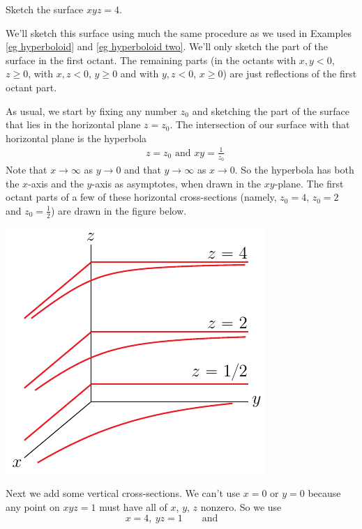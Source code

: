 \bigskip
\begin{eg}[$xyz=4$]\label{eg xyz}
\medskip
Sketch the surface $xyz=4$. 

\soln
We'll sketch this surface using much the same procedure as we used
in Examples \ref{eg hyperboloid} and \ref{eg hyperboloid two}.
We'll only sketch the part of the surface in the first octant. The
remaining parts (in the octants with $x,y<0$, $z\ge 0$, with
$x,z<0$, $y\ge 0$ and with $y,z<0$, $x\ge0$) are just reflections of
the first octant part.

As usual, we start by fixing any number $z_0$ 
and sketching the part of the surface that lies in the horizontal 
plane $z=z_0$. The intersection of our surface with that horizontal plane is 
the hyperbola
\begin{align*}
&z=z_0\text{\  \ and\ \ }xy=\frac{1}{z_0}
\end{align*}
Note that $x\rightarrow\infty$ as $y\rightarrow 0$ and that 
$y\rightarrow\infty$ as $x\rightarrow 0$. So the hyperbola 
has both the $x$-axis and the $y$-axis as asymptotes, when drawn in the $xy$-plane. 
The first octant parts of a few of these horizontal cross-sections 
(namely, $z_0=4$, $z_0=2$ and $z_0=\frac{1}{2}$)
are drawn in the figure below.
\begin{efig}
\begin{center}
   \includegraphics{seatB.pdf}
\end{center}
\end{efig}
Next we add some vertical cross-sections.
We can't use $x=0$ or $y=0$ because any point on $xyz=1$ 
must have all of $x$, $y$, $z$ nonzero. So we use
\begin{equation*}
x=4,\ yz=1\qquad\text{and}\qquad

\end{equation*}
\end{eg}
